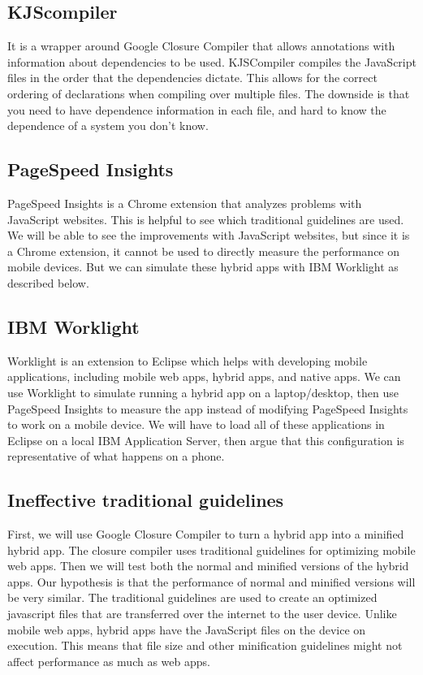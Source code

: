 \documentclass{acm_proc_article-sp}
\begin{document}
\subsection{KJScompiler}
It is a wrapper around Google Closure Compiler that allows annotations with information about dependencies to be used. KJSCompiler compiles the JavaScript files in the order that the dependencies dictate. This allows for the correct ordering of declarations when compiling over multiple files. The downside is that you need to have dependence information in each file, and hard to know the dependence of a system you don’t know. 

\subsection{PageSpeed Insights}
PageSpeed Insights is a Chrome extension that analyzes problems with JavaScript websites. This is helpful to see which traditional guidelines are used. We will be able to see the improvements with JavaScript websites, but since it is a Chrome extension, it cannot be used to directly measure the performance on mobile devices. But we can simulate these hybrid apps with IBM Worklight as described below.

\subsection{IBM Worklight}
Worklight is an extension to Eclipse which helps with developing mobile applications, including mobile web apps, hybrid apps, and native apps. We can use Worklight to simulate running a hybrid app on a laptop/desktop, then use PageSpeed Insights to measure the app instead of modifying PageSpeed Insights to work on a mobile device. We will have to load all of these applications in Eclipse on a local IBM Application Server, then argue that this configuration is representative of what happens on a phone.


\subsection{Ineffective traditional guidelines}
First, we will use Google Closure Compiler to turn a hybrid app into a minified hybrid app. The closure compiler uses traditional guidelines for optimizing mobile web apps. Then we will test both the normal and minified versions of the hybrid apps. Our hypothesis is that the performance of normal and minified versions will be very similar. The traditional guidelines are used to create an optimized javascript files that are transferred over the internet to the user device. Unlike mobile web apps, hybrid apps have the JavaScript files on the device on execution. This means that file size and other minification guidelines might not affect performance as much as web apps. 
\end{document}
